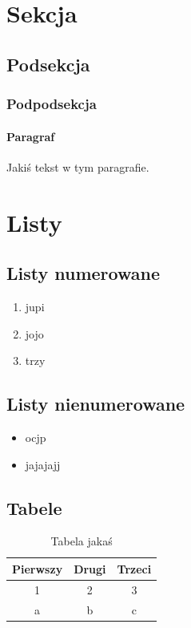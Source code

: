 \documentclass[12pt]{article}\usepackage[]{graphicx}\usepackage[]{color}
\begin{document}
\section{Sekcja}
\subsection{Podsekcja}
\subsubsection{Podpodsekcja}

\paragraph{Paragraf}
Jakiś tekst w tym paragrafie.

\section{Listy}
\subsection{Listy numerowane}

\begin{enumerate}
\item jupi
\item jojo
\item trzy
\end{enumerate}

\subsection{Listy nienumerowane}

\begin{itemize}
\item ocjp
\item jajajajj
\end{itemize}

\subsection{Tabele}

\begin{table}[ht!]
\centering
\caption{Tabela jakaś}\label{tab1}
\bigskip   %
\begin{tabular}{c|c|c}
Pierwszy & Drugi & Trzeci \\
\hline
1 & 2 & 3 \\
\hline
a & b & c \\
\end{tabular}
\end{table}
\end{document}
